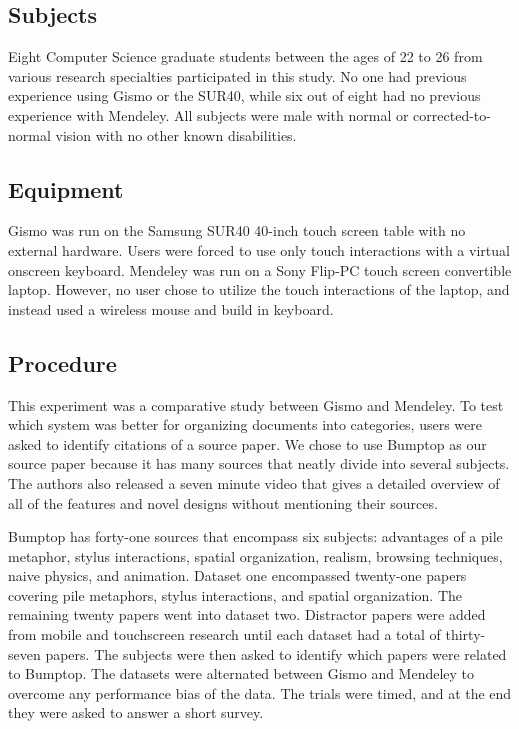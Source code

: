 \documentclass{article}
\begin{document}
\subsection*{Subjects}
	Eight Computer Science graduate students between the ages of 22 to 26 from various research specialties participated in this study.  No one had previous experience using Gismo or the SUR40, while six out of eight had no previous experience with Mendeley. All subjects were male with  normal or corrected-to-normal vision with no other known disabilities. 
\subsection*{Equipment}
	Gismo was run on the Samsung SUR40 40-inch touch screen table with no external hardware.  Users were forced to use only touch interactions with a virtual onscreen keyboard. Mendeley was run on a Sony Flip-PC touch screen convertible laptop.  However, no user chose to utilize the touch interactions of the laptop, and instead used a wireless mouse and build in keyboard.  
	
\subsection*{Procedure}

	This experiment was a comparative study between Gismo and Mendeley.  To test which system was better for organizing documents into categories, users were asked to identify citations of a source paper.  We chose to use Bumptop \cite{Agarawala2006}
	as our source paper because it has many sources that neatly divide into several subjects.  The authors also released a seven minute video that gives a detailed overview of all of the features and novel designs without mentioning their sources.   
	
	Bumptop has forty-one sources that encompass six subjects: advantages of a pile metaphor, stylus interactions, spatial organization, realism, browsing techniques, naive physics, and animation.  Dataset one encompassed twenty-one papers covering pile metaphors, stylus interactions, and spatial organization.  The remaining twenty papers went into dataset two.  Distractor papers were added from mobile and touchscreen research until each dataset had a total of thirty-seven papers.  The subjects were then asked to identify which papers were related to Bumptop.  The datasets were alternated between Gismo and Mendeley to overcome any performance bias of the data.  The trials were timed, and at the end they were asked to answer a short survey.  
	
\end{document}

